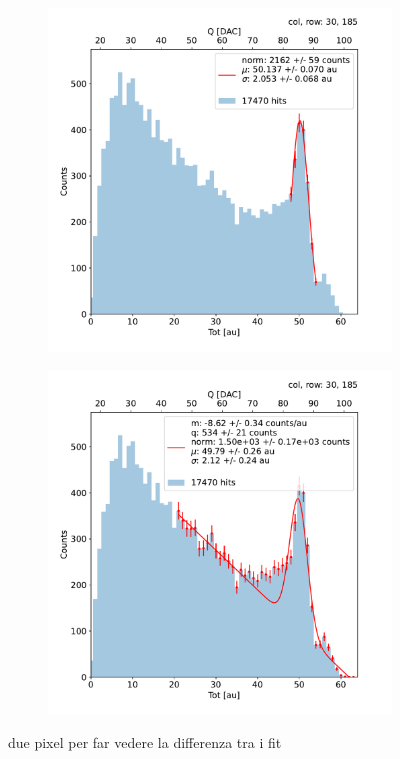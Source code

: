         \begin{figure}[h!]
            \begin{subfigure}{.5\textwidth}
            \centering
            \includegraphics[width=.99\linewidth]{figures/charaterization/fit_gauss_r185.pdf}
            \label{fig:}
            \end{subfigure}
            \begin{subfigure}{.5\textwidth}
            \centering
            \includegraphics[width=.99\linewidth]{figures/charaterization/fit_line_gauss_r185.pdf}
            \label{fig:fit_r185}
            \end{subfigure}
            \caption{due pixel per far vedere la differenza tra i fit}
        \end{figure}    


